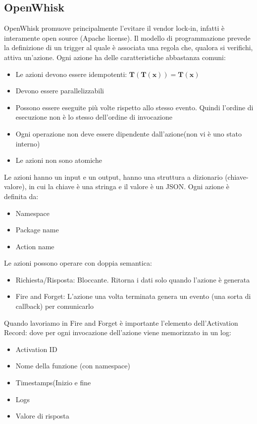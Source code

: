 \documentclass{article}
\begin{document}
		\subsection{OpenWhisk}
		OpenWhisk promuove principalmente l’evitare il vendor lock-in, infatti è interamente open source (Apache license). Il modello di programmazione prevede la definizione di un trigger al quale è associata una regola che, qualora si verifichi, attiva un’azione.
		Ogni azione ha delle caratteristiche abbastanza comuni:
		\begin{itemize}
		    \item Le azioni devono essere idempotenti: $\mathbf{T(T(x)) = T(x)}$
		    \item Devono essere parallelizzabili
		    \item Possono essere eseguite più volte rispetto allo stesso evento. Quindi l'ordine di esecuzione non è lo stesso dell'ordine di invocazione
		    \item Ogni operazione non deve essere dipendente dall'azione(non vi è uno stato interno)
		    \item Le azioni non sono atomiche
		\end{itemize}
		Le azioni hanno un input e un output, hanno una struttura a dizionario (chiave-valore), in cui la chiave è una stringa e il valore è un JSON. Ogni azione è definita da:
		\begin{itemize}
		    \item Namespace
		    \item Package name
		    \item Action name
		\end{itemize}
		Le azioni possono operare con doppia semantica:
		\begin{itemize}
		    \item Richiesta/Risposta: Bloccante. Ritorna i dati solo quando l'azione è generata
		    \item Fire and Forget: L'azione una volta terminata genera un evento (una sorta di callback) per comunicarlo 
		\end{itemize}
		Quando lavoriamo in Fire and Forget è importante l'elemento dell'Activation Record: dove per ogni invocazione dell'azione viene memorizzato in un log:
		\begin{itemize}
		    \item Activation ID
		    \item Nome della funzione (con namespace)
		    \item Timestamps(Inizio e fine
		    \item Logs
		    \item Valore di risposta
		\end{itemize}
\end{document}

